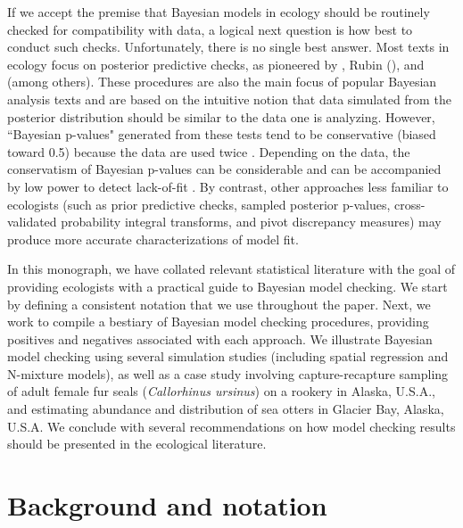 \documentclass[12pt,english]{article}
\begin{document}
\begin{spacing}{1.9}
If we accept the premise that Bayesian models in ecology should be
routinely checked for compatibility with data, a logical next question
is how best to conduct such checks.  Unfortunately, there is no single
best answer.  Most texts in ecology
\citep[e.g.,][]{KingEtAl2009,LinkBarker2010,KerySchaub2012} focus on
posterior predictive checks, as pioneered by \citet{Guttman1967},
Rubin (\citeyear{Rubin1981,Rubin1984}), and \citet{GelmanEtAl1996}
(among others).  These procedures are also the main focus of popular
Bayesian analysis texts
\citep[e.g.,][]{CressieWikle2011,GelmanEtAl2014} and are based on the
intuitive notion that data simulated from the posterior distribution
should be similar to the data one is analyzing.  However, ``Bayesian
p-values" generated from these tests tend to be conservative (biased
toward 0.5) because the data are used twice \citep[once to fit the
model and once to test the
model;][]{BayarriBerger2000,RobinsEtAl2000}.  Depending on the data,
the conservatism of Bayesian p-values can be considerable
\citep{Zhang2014} and can be accompanied by low power to detect
lack-of-fit \citep{YuanJohnson2012,Zhang2014}. By contrast, other
approaches less familiar to ecologists (such as prior predictive
checks, sampled posterior p-values, cross-validated probability
integral transforms, and pivot discrepancy measures) may produce more
accurate characterizations of model fit.

In this monograph, we have collated relevant statistical literature
with the goal of providing ecologists with a practical guide to
Bayesian model checking.  We start by defining a consistent notation
that we use throughout the paper. Next, we work to compile a bestiary
of Bayesian model checking procedures, providing positives and
negatives associated with each approach.  We illustrate Bayesian model
checking using several simulation studies (including spatial
regression and N-mixture models), as well as a case study involving
capture-recapture sampling of adult female fur seals
(\textit{Callorhinus ursinus}) on a rookery in Alaska, U.S.A., and
estimating abundance and distribution of sea otters in Glacier Bay,
Alaska, U.S.A.  We conclude with several recommendations on how model
checking results should be presented in the ecological literature.



\section{Background and notation}


\end{spacing}
\end{document}
